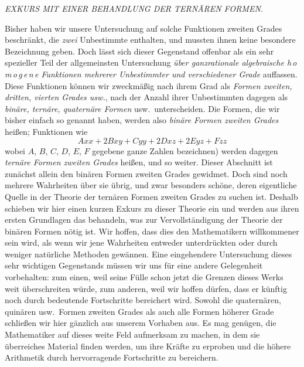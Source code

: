 \begin{center}
\textit{EXKURS MIT EINER BEHANDLUNG DER TERNÄREN FORMEN.}
\end{center}

Bisher haben wir unsere Untersuchung auf solche Funktionen zweiten Grades beschränkt, die \textit{zwei} Unbestimmte enthalten, und mussten ihnen keine besondere Bezeichnung geben. Doch lässt sich dieser Gegenstand offenbar als ein sehr spezieller Teil der allgemeinsten Untersuchung \textit{über ganzrationale algebraische h\,o\,m\,o\,g\,e\,n\,e Funktionen mehrerer Unbestimmter und verschiedener Grade} auffassen. Diese Funktionen können wir zweckmäßig nach ihrem Grad als \textit{Formen zweiten, dritten, vierten Grades usw.}, nach der Anzahl ihrer Unbestimmten dagegen als \textit{binäre, ternäre, quaternäre Formen} usw.\ unterscheiden. Die Formen, die wir bisher einfach so genannt haben, werden also \textit{binäre Formen zweiten Grades} heißen; Funktionen wie
\[
Axx+2Bxy+Cyy+2Dxz+2Eyz+Fzz
\]
wobei $A$, $B$, $C$, $D$, $E$, $F$ gegebene ganze Zahlen bezeichnen) werden dagegen \textit{ternäre Formen zweiten Grades} heißen, und so weiter. Dieser Abschnitt ist zunächst allein den binären Formen zweiten Grades gewidmet. Doch sind noch mehrere Wahrheiten über sie übrig, und zwar besonders schöne, deren eigentliche Quelle in der Theorie der ternären Formen zweiten Grades zu suchen ist. Deshalb schieben wir hier einen kurzen Exkurs zu dieser Theorie ein und werden aus ihren ersten Grundlagen das behandeln, was zur Vervollständigung der Theorie der binären Formen nötig ist. Wir hoffen, dass dies den Mathematikern willkommener sein wird, als wenn wir jene Wahrheiten entweder unterdrückten oder durch weniger natürliche Methoden gewännen. Eine eingehendere Untersuchung dieses sehr wichtigen Gegenstands müssen wir uns für eine andere Gelegenheit vorbehalten: zum einen, weil seine Fülle schon jetzt die Grenzen dieses Werks weit überschreiten würde, zum anderen, weil wir hoffen dürfen, dass er künftig noch durch bedeutende Fortschritte bereichert wird. Sowohl die quaternären, quinären usw.\ Formen zweiten Grades als auch alle Formen höherer Grade schließen wir hier gänzlich aus unserem Vorhaben aus. Es mag genügen, die Mathematiker auf dieses weite Feld aufmerksam zu machen, in dem sie überreiches Material finden werden, um ihre Kräfte zu erproben und die höhere Arithmetik durch hervorragende Fortschritte zu bereichern.


